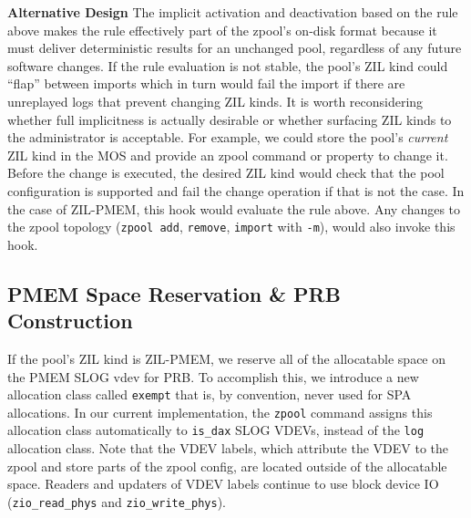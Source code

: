 \documentclass[12pt,a4paper,twoside]{book}
\begin{document}
\textbf{Alternative Design}
The implicit activation and deactivation based on the rule above makes the rule effectively part of the zpool's on-disk format because it must deliver deterministic results for an unchanged pool, regardless of any future software changes.
If the rule evaluation is not stable, the pool's ZIL kind could ``flap'' between imports which in turn would fail the import if there are unreplayed logs that prevent changing ZIL kinds.
It is worth reconsidering whether full implicitness is actually desirable or whether surfacing ZIL kinds to the administrator is acceptable.
For example, we could store the pool's \textit{current} ZIL kind in the MOS and provide an zpool command or property to change it.
Before the change is executed, the desired ZIL kind would check that the pool configuration is supported and fail the change operation if that is not the case.
In the case of ZIL-PMEM, this hook would evaluate the rule above.
Any changes to the zpool topology (\lstinline{zpool add}, \lstinline{remove}, \lstinline{import} with \lstinline{-m}), would also invoke this hook.

\subsection{PMEM Space Reservation \& PRB Construction}\label{sec:zilpmemzilkind:spacereservation}

If the pool's ZIL kind is ZIL-PMEM, we reserve all of the allocatable space on the PMEM SLOG vdev for PRB.
To accomplish this, we introduce a new allocation class called \lstinline{exempt} that is, by convention, never used for SPA allocations.
In our current implementation, the \lstinline{zpool} command assigns this allocation class automatically to \lstinline{is_dax} SLOG VDEVs, instead of the \lstinline{log} allocation class.
Note that the VDEV labels, which attribute the VDEV to the zpool and store parts of the zpool config, are located outside of the allocatable space.
Readers and updaters of VDEV labels continue to use block device IO (\lstinline{zio_read_phys} and \lstinline{zio_write_phys}).
\end{document}
